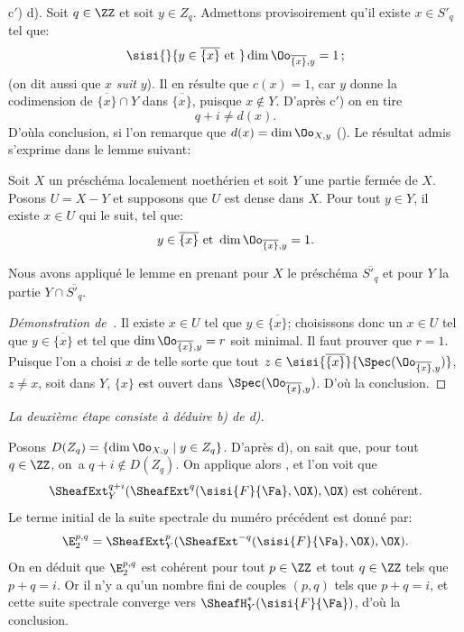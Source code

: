 c$'$) \ALORS d). Soit $q\in\ZZ$ et soit $y\in Z_q$. Admettons provisoirement qu'il existe $x\in S'_q$ tel que:
\[
\sisi{}{y\in\overline{\{x\}}\textup{ et }}\dim \Oo_{\overline{\{x\}}, y}=1\, \text{;}\]
(on dit aussi que $x$ \emph{suit} $y$). Il en r\'esulte que $c(x)=1$, car $y$ \og donne la codimension de $\overline{\{x\}}\cap Y$ dans $\overline{\{x\}}$\fg, puisque $x\not\in Y$. D'apr\`es c$'$) on en tire
\[q+i\neq d(x).
\]
D'o\`u\pageoriginale la conclusion, si l'on remarque que $d(x)=\dim \Oo_{X, y}$ (). Le r\'esultat admis s'exprime dans le lemme suivant:

\begin{lemme} \label{VIII.2.5} Soit $X$ un pr\'esch\'ema localement noeth\'erien et soit $Y$ une partie ferm\'ee de $X$. Posons $U=X-Y$ et supposons que $U$ est dense dans $X$. Pour tout $y\in Y$, il existe $x\in U$ \og qui le suit\fg, \ie tel que:
\[y\in\overline{\{x\}}\text{ et } \dim\Oo_{\overline{\{x\}}, y}=1.
\]
\end{lemme}

Nous avons appliqu\'e le lemme en prenant pour $X$ le pr\'esch\'ema $\overline{S'_q}$ et pour $Y$ la partie $Y\cap \overline{S'_q}$.

\begin{proof}[D\'emonstration de~]
Il existe $x\in U$ tel que $y\in\overline{\{x\}}$; choisissons donc un $x\in U$ tel que $y\in\overline{\{x\}}$ et tel que $\dim \Oo_{\overline{\{x\}}, y}=r$ soit minimal. Il faut prouver que $r=1$. Puisque l'on a choisi $x$ de telle sorte que tout $z\in\sisi{\overline{\{x\}}}{\Spec(\Oo_{\overline{\{x\}}, y})}$, $z\neq x$, soit dans $Y$, $\{x\}$ est ouvert dans $\Spec(\Oo_{\overline{\{x\}}, y})$. D'o\`u la conclusion.
\skipqed
\end{proof}

\emph{La deuxi\`eme \'etape consiste \`a d\'eduire \textup{b)} de \textup{d)}.}

\noindent Posons $D(Z_q)=\{\dim \Oo_{X, y} \mid y\in Z_q\}$. D'apr\`es d), on sait que, pour tout $q\in\ZZ$, on~a $q+i\not\in D(Z_q)$. On applique alors , et l'on voit que
\[
\SheafExt^{q+i}_Y(\SheafExt^q(\sisi{F}{{\Fa}}, \OX), \OX) \text{ est coh\'erent.}\]
Le terme initial de la suite spectrale du num\'ero pr\'ec\'edent est donn\'e par:
\[
\E^{p, q}_2=\SheafExt^p_Y(\SheafExt^{-q}(\sisi{F}{{\Fa}}, \OX), \OX).
\]
On en d\'eduit que $\E^{p, q}_2$ est coh\'erent pour tout $p\in\ZZ$ et tout $q\in\ZZ$ tels que $p+q=i$. Or il n'y a qu'un nombre fini de couples $(p, q)$ tels que $p+q=i$, et cette suite spectrale converge vers $\SheafH^\ast_Y(\sisi{F}{{\Fa}})$, d'o\`u la conclusion.

